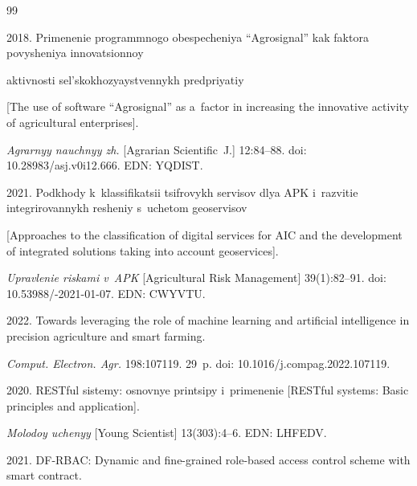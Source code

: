 {{\begin{thebibliography}{99}

 2018. Primenenie pro\-gram\-mno\-go obes\-pe\-che\-niya ``Ag\-ro\-sig\-nal'' kak fak\-to\-ra po\-vy\-she\-niya in\-no\-va\-tsi\-on\-noy 

 ak\-tiv\-nosti sel's\-ko\-kho\-zyayst\-ven\-nykh pred\-pri\-yatiy 

 [The use of software ``Agrosignal'' as a~factor in increasing the innovative activity of agricultural enterprises]. 

  \textit{Ag\-rar\-nyy na\-uch\-nyy zh.} [Agrarian Scientific~J.] 12:84--88. doi: 10.28983\!/\!asj.v0i12.666. EDN: YQDIST.



 2021. Podkhody k~klas\-si\-fi\-ka\-tsii tsif\-ro\-vykh ser\-vi\-sov dlya APK i~raz\-vi\-tie integ\-ri\-ro\-van\-nykh re\-she\-niy s~uche\-tom geo\-ser\-vi\-sov 

 [Approaches to the classification of digital services for AIC and the development of integrated solutions taking into account geoservices]. 

  \textit{Uprav\-le\-nie ris\-ka\-mi v~APK} [Agricultural Risk Management] 39(1):82--91. doi: 10.53988\!/-2021-01-07. EDN: CWYVTU.



 2022. Towards leveraging the role of machine learning and artificial intelligence in precision agriculture and smart farming. 

  \textit{Comput. Electron. Agr.} 198:107119. 29~p. doi: 10.1016\!/\!j.compag.2022.107119.



 2020. RESTful sistemy: osnov\-nye prin\-tsi\-py i~pri\-me\-ne\-nie [RESTful systems: Basic principles and application]. 

  \textit{Mo\-lo\-doy uche\-nyy} [Young Scientist] 13(303):4--6. EDN: LHFEDV.



 2021. DF-RBAC: Dynamic and fine-grained role-based access control scheme with smart contract. 


\end{thebibliography}}}
